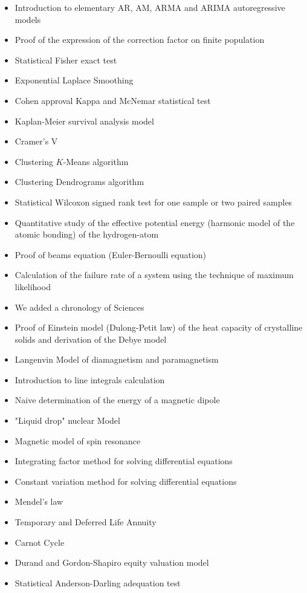 \begin{itemize}
\begin{itemize}[noitemsep]
			\item Introduction to elementary  AR, AM, ARMA and ARIMA autoregressive models
			\item Proof of the expression of the correction factor on finite population
			\item Statistical Fisher exact test
			\item Exponential Laplace Smoothing
			\item Cohen approval Kappa and McNemar statistical test
			\item Kaplan-Meier survival analysis model
			\item Cramer's V
			\item Clustering $K$-Means algorithm
			\item Clustering Dendrograms algorithm
			\item Statistical Wilcoxon signed rank test for one sample or two paired samples
			\item Quantitative study of the effective potential energy (harmonic model of the atomic bonding) of the hydrogen-atom
			\item Proof of beams equation (Euler-Bernoulli equation)
			\item Calculation of the failure rate of a system using the technique of maximum likelihood
			\item We added a chronology of Sciences
			\item Proof of Einstein model (Dulong-Petit law) of the heat capacity of crystalline solids and derivation of the Debye model
			\item Langenvin Model of diamagnetism and paramagnetism
			\item Introduction to line integrals calculation
			\item Naive determination of the energy of a magnetic dipole
			\item "Liquid drop" nuclear Model 
			\item Magnetic model of spin resonance
			\item Integrating factor method for solving differential equations
			\item Constant variation method for solving differential equations
			\item Mendel's law
			\item Temporary and Deferred Life Annuity
			\item Carnot Cycle
			\item Durand and Gordon-Shapiro equity valuation model 
			\item Statistical Anderson-Darling adequation test

\end{itemize}
\end{itemize}
